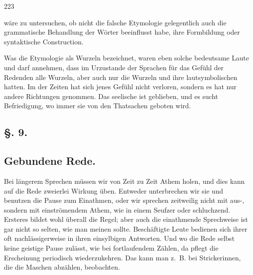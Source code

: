 {{\textbar}223{\textbar}\label{fp.223}



 wäre zu untersuchen, ob nicht die falsche Etymologie gelegentlich auch die grammatische Behandlung der Wörter beeinflusst habe, ihre Formbildung oder syntaktische Construction.

\largerpage[-1]

Was die Etymologie als Wurzeln bezeichnet, waren eben solche bedeutsame Laute und  darf annehmen, dass im Urzustande der Sprachen für das Gefühl der Redenden alle Wurzeln, aber auch nur die Wurzeln und ihre  lautsymbolischen  hatten. Im  der Zeiten hat sich jenes Gefühl nicht verloren, sondern es hat nur andere Richtungen genommen. Das seelische  ist geblieben, und es sucht Befriedigung, wo immer sie von den Thatsachen geboten wird.

\subsection*{§. 9.}\label{III.II.II.9}
\subsection*{Gebundene Rede.}
Bei längerem Sprechen müssen wir von Zeit zu Zeit Athem holen, und dies kann auf die Rede zweierlei Wirkung üben. Entweder unterbrechen wir sie und benutzen die Pause zum Einathmen, oder wir sprechen zeitweilig nicht mit \mbox{aus-,} sondern mit einströmendem Athem, wie in einem Seufzer oder schluchzend. Ersteres bildet wohl überall die Regel; aber auch die einathmende Sprechweise ist gar nicht so selten, wie man meinen sollte. Beschäftigte Leute bedienen sich ihrer oft nachlässigerweise in ihren einsylbigen Antworten. Und wo die Rede selbst keine geistige Pause zulässt, wie bei fortlaufendem Zählen, da pflegt die Erscheinung periodisch wiederzukehren. Das kann man z.~B. bei Strickerinnen, die die Maschen abzählen, beobachten.

}
